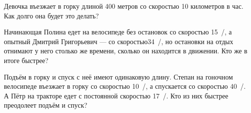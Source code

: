 ﻿
\begin{itemize}

\itA Девочка въезжает в горку длиной 400 метров со скоростью 10 километров в час. Как долго она будет это делать?

\itB Начинающая Полина едет на велосипеде без остановок со скоростью \SI{15}{/}, а опытный Дмитрий Григорьевич — со скоростью\linebreak \SI{34}{/}, но остановки на отдых отнимают у него столько же времени, сколько он находится в движении. Кто же в итоге быстрее?

\itC Подъём в горку и спуск с неё имеют одинаковую длину. Степан на гоночном велосипеде въезжает в горку со скоростью \SI{10}{/}, а спускается со скоростью \SI{40}{/}. А Пётр на тракторе едет с постоянной скоростью \SI{17}{/}. Кто из них быстрее преодолеет подъём и спуск?
\end{itemize}